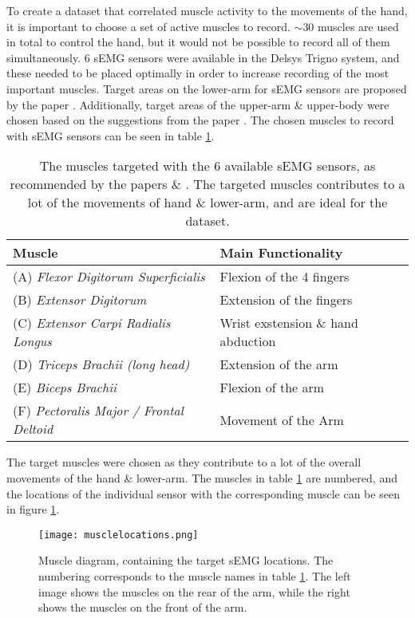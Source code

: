 \documentclass[../main.tex]{subfiles}
\begin{document}
To create a dataset that correlated muscle activity to the movements of the hand, it is important to choose a set of active muscles to record.
$\sim 30$ muscles are used in total to control the hand, but it would not be possible to record all of them simultaneously.
6 sEMG sensors were available in the Delsys Trigno \cite{trigno} system, and these needed to be placed optimally in order to increase recording of the most important muscles.
Target areas on the lower-arm for sEMG sensors are proposed by the paper \cite{jarque2019}.
Additionally, target areas of the upper-arm \& upper-body were chosen based on the suggestions from the paper \cite{Batzianoulis2018}.
The chosen muscles to record with sEMG sensors can be seen in table \ref{tab:muscletargets}.

\begin{table}[H]
\begin{center}
\begin{tabular}{ |l|l| } 
\hline
Muscle & Main Functionality \\ 
\hline
(A) \textit{Flexor Digitorum Superficialis} & Flexion of the 4 fingers \\
(B) \textit{Extensor Digitorum} & Extension of the fingers \\
(C) \textit{Extensor Carpi Radialis Longus} & Wrist exstension \& hand abduction \\
(D) \textit{Triceps Brachii (long head)} & Extension of the arm \\
(E) \textit{Biceps Brachii} & Flexion of the arm \\
(F) \textit{Pectoralis Major / Frontal Deltoid} & Movement of the Arm \\
\hline
\end{tabular}
\caption{The muscles targeted with the 6 available sEMG sensors, as recommended by the papers  \cite{jarque2019} \& \cite{Batzianoulis2018}.
 The targeted muscles contributes to a lot of the movements of hand \& lower-arm, and are ideal for the dataset.
}
\label{tab:muscletargets}
\end{center}
\end{table}

The target muscles were chosen as they contribute to a lot of the overall movements of the hand \& lower-arm.
The muscles in table \ref{tab:muscletargets} are numbered, and the locations of the individual sensor with the corresponding muscle can be seen in figure \ref{fig:musclesensors}.

\begin{figure}[H]
\begin{center}
\texttt{[image: musclelocations.png]}
\caption{Muscle diagram, containing the target sEMG locations. The numbering corresponds to the muscle names in table \ref{tab:muscletargets}. The left image shows the muscles on the rear of the arm, while the right shows the muscles on the front of the arm.}
\label{fig:musclesensors}
\end{center}
\end{figure}
\end{document}
